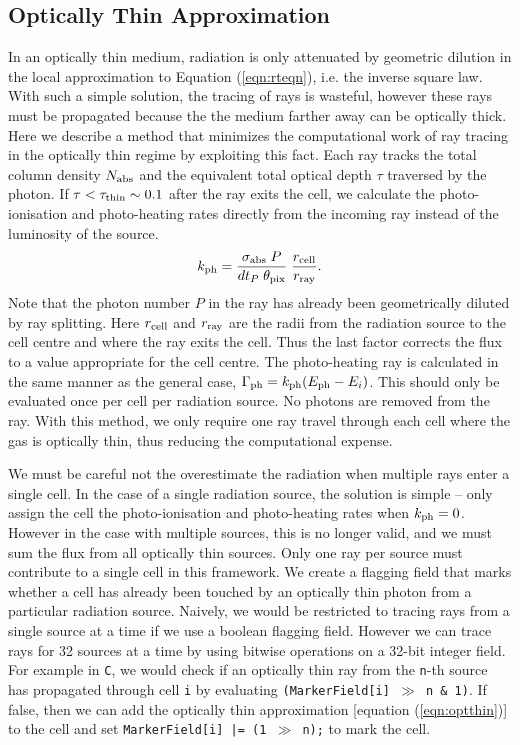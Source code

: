 \documentclass[useAMS,usenatbib]{mn2e}
\begin{document}
\subsection{Optically Thin Approximation}

In an optically thin medium, radiation is only attenuated by geometric
dilution in the local approximation to Equation (\ref{eqn:rteqn}),
i.e. the inverse square law.  With such a simple solution, the tracing
of rays is wasteful, however these rays must be propagated because the
the medium farther away can be optically thick.  Here we describe a
method that minimizes the computational work of ray tracing in the
optically thin regime by exploiting this fact.  Each ray tracks the
total column density $N_{\rm abs}$ and the equivalent total optical
depth $\tau$ traversed by the photon.  If $\tau < \tau_{\rm thin} \sim
0.1$ after the ray exits the cell, we calculate the photo-ionisation
and photo-heating rates directly from the incoming ray instead of the
luminosity of the source.
\begin{equation}
  \label{eqn:optthin}
  k_{\rm ph} = \frac{\sigma_{\rm abs} \; P}{dt_P \; \theta_{\rm pix}}
  \; \frac{r_{\rm cell}}{r_{\rm ray}}.
\end{equation}
Note that the photon number $P$ in the ray has already been
geometrically diluted by ray splitting.  Here $r_{\rm cell}$ and
$r_{\rm ray}$ are the radii from the radiation source to the cell
centre and where the ray exits the cell.  Thus the last factor
corrects the flux to a value appropriate for the cell centre.  The
photo-heating ray is calculated in the same manner as the general
case, $\Gamma_{\rm ph} = k_{\rm ph} (E_{\rm ph} - E_i)$.  This should
only be evaluated once per cell per radiation source.  No photons are
removed from the ray.  With this method, we only require one ray
travel through each cell where the gas is optically thin, thus
reducing the computational expense.

We must be careful not the overestimate the radiation when multiple
rays enter a single cell.  In the case of a single radiation source,
the solution is simple -- only assign the cell the photo-ionisation
and photo-heating rates when $k_{\rm ph} = 0$.  However in the case
with multiple sources, this is no longer valid, and we must sum the
flux from all optically thin sources.  Only one ray per source must
contribute to a single cell in this framework.  We create a flagging
field that marks whether a cell has already been touched by an
optically thin photon from a particular radiation source.  Naively, we
would be restricted to tracing rays from a single source at a time if
we use a boolean flagging field.  However we can trace rays for 32
sources at a time by using bitwise operations on a 32-bit integer
field.  For example in \texttt{C}, we would check if an optically thin
ray from the \texttt{n}-th source has propagated through cell
\texttt{i} by evaluating \texttt{(MarkerField[i] $\gg$ n \& 1)}.  If
false, then we can add the optically thin approximation [equation
(\ref{eqn:optthin})] to the cell and set \texttt{MarkerField[i] |= (1
  $\gg$ n);} to mark the cell.
\end{document}
